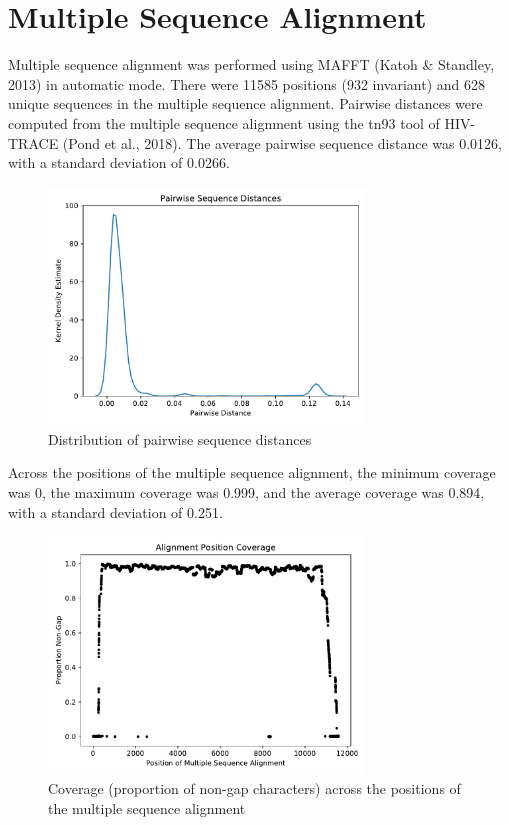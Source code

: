 \documentclass{article}
\begin{document}
\section{Multiple Sequence Alignment}
Multiple sequence alignment was performed using MAFFT (Katoh \& Standley, 2013) in automatic mode. There were 11585 positions (932 invariant) and 628 unique sequences in the multiple sequence alignment. Pairwise distances were computed from the multiple sequence alignment using the tn93 tool of HIV-TRACE (Pond et al., 2018). The average pairwise sequence distance was 0.0126, with a standard deviation of 0.0266.

\begin{figure}[h]
\centering
\includegraphics[width=0.75\textwidth,keepaspectratio]{./figs/pairwise_distances_sequences.pdf}
\caption{Distribution of pairwise sequence distances}
\end{figure}

Across the positions of the multiple sequence alignment, the minimum coverage was 0, the maximum coverage was 0.999, and the average coverage was 0.894, with a standard deviation of 0.251.

\begin{figure}[h]
\centering
\includegraphics[width=0.75\textwidth,keepaspectratio]{./figs/alignment_coverage.pdf}
\caption{Coverage (proportion of non-gap characters) across the positions of the multiple sequence alignment}
\end{figure}
\end{document}
